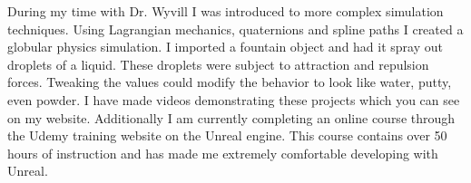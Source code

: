 During my time with Dr. Wyvill I was introduced to more complex simulation techniques.
Using Lagrangian mechanics, quaternions and spline paths I created a globular physics simulation. 
I imported a fountain object and had it spray out droplets of a liquid.
These droplets were subject to attraction and repulsion forces.
Tweaking the values could modify the behavior to look like water, putty, even powder.
I have made videos demonstrating these projects which you can see on my website.
Additionally I am currently completing an online course through the Udemy training website on the Unreal engine.
This course contains over 50 hours of instruction and has made me extremely comfortable developing with Unreal.
